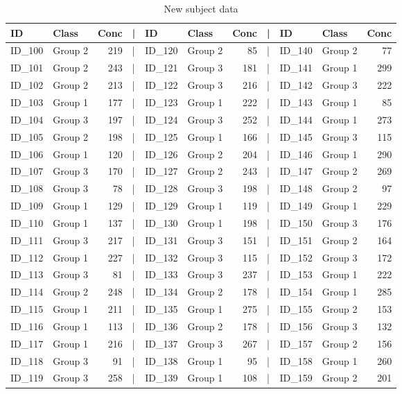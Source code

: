 \documentclass[smallextended]{svjour3}       %
\begin{document}
\begin{table}

\caption{\label{tab:show-table-2}New subject data}
\centering
\begin{tabular}[t]{llrlllrlllr}
\toprule
ID & Class & Conc & | & ID & Class & Conc & | & ID & Class & Conc\\
\midrule
ID\_100 & Group 2 & 219 & | & ID\_120 & Group 2 & 85 & | & ID\_140 & Group 2 & 77\\
ID\_101 & Group 2 & 243 & | & ID\_121 & Group 3 & 181 & | & ID\_141 & Group 1 & 299\\
ID\_102 & Group 2 & 213 & | & ID\_122 & Group 3 & 216 & | & ID\_142 & Group 3 & 222\\
ID\_103 & Group 1 & 177 & | & ID\_123 & Group 1 & 222 & | & ID\_143 & Group 1 & 85\\
ID\_104 & Group 3 & 197 & | & ID\_124 & Group 3 & 252 & | & ID\_144 & Group 1 & 273\\
\addlinespace
ID\_105 & Group 2 & 198 & | & ID\_125 & Group 1 & 166 & | & ID\_145 & Group 3 & 115\\
ID\_106 & Group 1 & 120 & | & ID\_126 & Group 2 & 204 & | & ID\_146 & Group 1 & 290\\
ID\_107 & Group 3 & 170 & | & ID\_127 & Group 2 & 243 & | & ID\_147 & Group 2 & 269\\
ID\_108 & Group 3 & 78 & | & ID\_128 & Group 3 & 198 & | & ID\_148 & Group 2 & 97\\
ID\_109 & Group 1 & 129 & | & ID\_129 & Group 1 & 119 & | & ID\_149 & Group 1 & 229\\
\addlinespace
ID\_110 & Group 1 & 137 & | & ID\_130 & Group 1 & 198 & | & ID\_150 & Group 3 & 176\\
ID\_111 & Group 3 & 217 & | & ID\_131 & Group 3 & 151 & | & ID\_151 & Group 2 & 164\\
ID\_112 & Group 1 & 227 & | & ID\_132 & Group 3 & 115 & | & ID\_152 & Group 3 & 172\\
ID\_113 & Group 3 & 81 & | & ID\_133 & Group 3 & 237 & | & ID\_153 & Group 1 & 222\\
ID\_114 & Group 2 & 248 & | & ID\_134 & Group 2 & 178 & | & ID\_154 & Group 1 & 285\\
\addlinespace
ID\_115 & Group 1 & 211 & | & ID\_135 & Group 1 & 275 & | & ID\_155 & Group 2 & 153\\
ID\_116 & Group 1 & 113 & | & ID\_136 & Group 2 & 178 & | & ID\_156 & Group 3 & 132\\
ID\_117 & Group 1 & 216 & | & ID\_137 & Group 3 & 267 & | & ID\_157 & Group 2 & 156\\
ID\_118 & Group 3 & 91 & | & ID\_138 & Group 1 & 95 & | & ID\_158 & Group 1 & 260\\
ID\_119 & Group 3 & 258 & | & ID\_139 & Group 1 & 108 & | & ID\_159 & Group 2 & 201\\
\bottomrule
\end{tabular}
\end{table}
\end{document}
